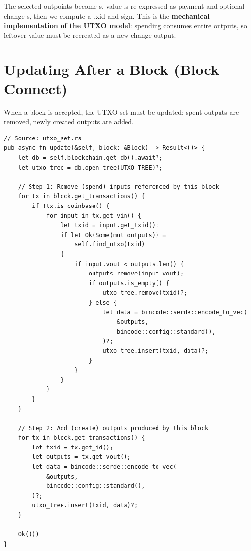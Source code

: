 \begin{notebox}
The selected outpoints become s, value is re-expressed as payment and optional change s, then we compute a txid and sign. This is the \textbf{mechanical implementation of the UTXO model}: spending consumes entire outputs, so leftover value must be recreated as a new change output.
\end{notebox}

\section{Updating After a Block (Block Connect)}
\label{sec:ch09-4-block-connect}

When a block is accepted, the UTXO set must be updated: spent outputs are removed, newly created outputs are added.

\begin{listing}[htbp]
\caption{Update the UTXO set when a block is connected}
\label{lst:ch09-4-6}
\begin{verbatim}
// Source: utxo_set.rs
pub async fn update(&self, block: &Block) -> Result<()> {
    let db = self.blockchain.get_db().await?;
    let utxo_tree = db.open_tree(UTXO_TREE)?;

    // Step 1: Remove (spend) inputs referenced by this block
    for tx in block.get_transactions() {
        if !tx.is_coinbase() {
            for input in tx.get_vin() {
                let txid = input.get_txid();
                if let Ok(Some(mut outputs)) =
                    self.find_utxo(txid)
                {
                    if input.vout < outputs.len() {
                        outputs.remove(input.vout);
                        if outputs.is_empty() {
                            utxo_tree.remove(txid)?;
                        } else {
                            let data = bincode::serde::encode_to_vec(
                                &outputs,
                                bincode::config::standard(),
                            )?;
                            utxo_tree.insert(txid, data)?;
                        }
                    }
                }
            }
        }
    }

    // Step 2: Add (create) outputs produced by this block
    for tx in block.get_transactions() {
        let txid = tx.get_id();
        let outputs = tx.get_vout();
        let data = bincode::serde::encode_to_vec(
            &outputs,
            bincode::config::standard(),
        )?;
        utxo_tree.insert(txid, data)?;
    }

    Ok(())
}
\end{verbatim}
\end{listing}

